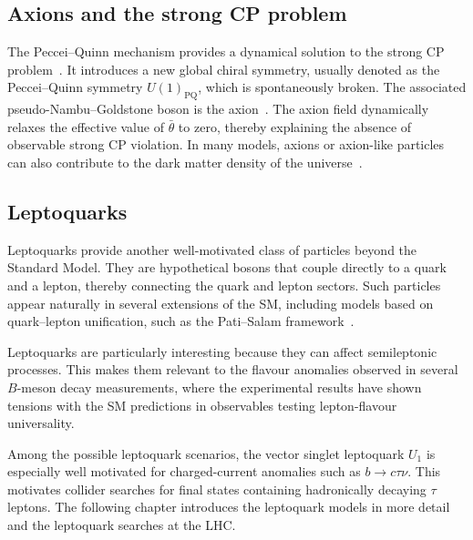 \subsection{Axions and the strong CP problem}
\label{subsec:axion}

The Peccei--Quinn mechanism provides a dynamical solution to the strong CP problem~\cite{PecceiQuinn1977PRL,PecceiQuinn1977PRD}. 
It introduces a new global chiral symmetry, usually denoted as the Peccei--Quinn symmetry $U(1)_{\mathrm{PQ}}$, which is spontaneously broken.
The associated pseudo-Nambu--Goldstone boson is the axion~\cite{Weinberg1978Axion,Wilczek1978Axion}. 
The axion field dynamically relaxes the effective value of $\bar{\theta}$ to zero, thereby explaining the absence of observable strong CP violation. 
In many models, axions or axion-like particles can also contribute to the dark matter density of the universe~\cite{KimCarosi2010}.

\subsection{Leptoquarks}
\label{subsec:leptoquarks_motivation}

Leptoquarks provide another well-motivated class of particles beyond the Standard Model. 
They are hypothetical bosons that couple directly to a quark and a lepton, thereby connecting the quark and lepton sectors. 
Such particles appear naturally in several extensions of the SM, including models based on quark--lepton unification, such as the Pati--Salam framework~\cite{PatiSalam1974}. 

Leptoquarks are particularly interesting because they can affect semileptonic processes. 
This makes them relevant to the flavour anomalies observed in several $B$-meson decay measurements, where the experimental results have shown tensions with the SM predictions in observables testing lepton-flavour universality. 

Among the possible leptoquark scenarios, the vector singlet leptoquark $U_{1}$ is especially well motivated for charged-current anomalies such as $b\rightarrow c\tau\nu$. 
This motivates collider searches for final states containing hadronically decaying $\tau$ leptons. 
The following chapter introduces the leptoquark models in more detail and the leptoquark searches at the LHC.
